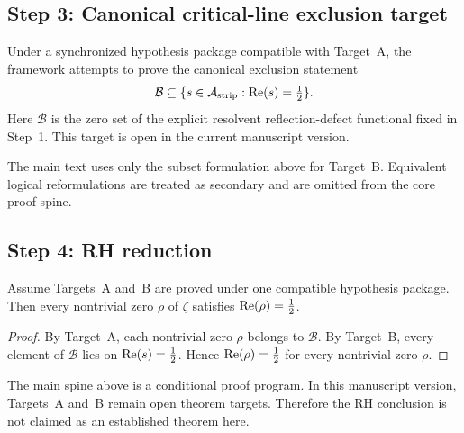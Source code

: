 \subsection*{Step 3: Canonical critical-line exclusion target}
\begin{drafttheorem}
\label{thm:target-uniqueness}
Under a synchronized hypothesis package compatible with Target~A, the framework attempts to prove the canonical exclusion statement
\[
\mathcal{B}\subseteq\{s\in\mathcal{A}_{\mathrm{strip}}:\operatorname{Re}(s)=\tfrac12\}.
\]
Here $\mathcal{B}$ is the zero set of the explicit resolvent reflection-defect functional fixed in Step~1.
This target is open in the current manuscript version.
\end{drafttheorem}

\begin{remark}
The main text uses only the subset formulation above for Target~B.
Equivalent logical reformulations are treated as secondary and are omitted from the core proof spine.
\end{remark}

\subsection*{Step 4: RH reduction}
\begin{proposition}
\label{prop:rh-reduction-main-spine}
Assume Targets~A and~B are proved under one compatible hypothesis package.
Then every nontrivial zero $\rho$ of $\zeta$ satisfies $\operatorname{Re}(\rho)=\tfrac12$.
\end{proposition}

\begin{proof}
By Target~A, each nontrivial zero $\rho$ belongs to $\mathcal{B}$.
By Target~B, every element of $\mathcal{B}$ lies on $\operatorname{Re}(s)=\tfrac12$.
Hence $\operatorname{Re}(\rho)=\tfrac12$ for every nontrivial zero $\rho$.
\end{proof}

\begin{remark}
The main spine above is a conditional proof program.
In this manuscript version, Targets~A and~B remain open theorem targets.
Therefore the RH conclusion is not claimed as an established theorem here.
\end{remark}
